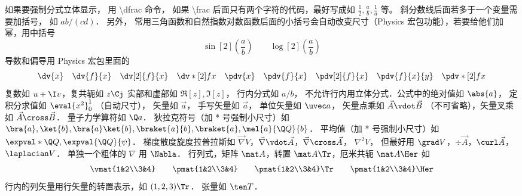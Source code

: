 如果要强制分式立体显示， 用 \textbackslash dfrac 命令， 如果 \textbackslash frac 后面只有两个字符的代码，最好写成如 $\frac12, \frac ab, \frac1a$ 等。 斜分数线后面若多于一个变量需要加括号， 如 $ab/(cd)$． 另外， 常用三角函数和自然指数对数函数后面的小括号会自动改变尺寸（Physics 宏包功能），若要给他们加幂，用中括号
\begin{equation}
\sin[2](\frac ab) \qquad \log[2](\frac ab)
\end{equation}
导数和偏导用 Physics 宏包里面的
\begin{equation}
\dv{x} \quad \dv{f}{x} \quad \dv[2]{f}{x} \quad \dv*[2]{f}{x} \quad
\pdv{x} \quad \pdv{f}{x} \quad \pdv[2]{f}{x} \quad \pdv{f}{x}{y} \quad \pdv*[2]{f}{x}
\end{equation}
复数如 $u+\I v$，复共轭如 $z\Cj$ 实部和虚部如 $\Re[z], \Im[z]$，  行内分式如 $a/b$， 不允许行内用立体分式．公式中的绝对值如 $\abs{a}$， 定积分求值如 $\eval{x^2}_0^1$ （自动尺寸）， 矢量如 $\vec a$， 手写矢量如 $\overrightarrow{a}$， 单位矢量如 $\uvec a$， 矢量点乘如 $\vec A \vdot \vec B$ （不可省略），矢量叉乘如 $\vec A\cross\vec B$． 量子力学算符如 $\Q a$． 狄拉克符号（加 * 号强制小尺寸）如 $\bra{a}, \ket{b}, \bra{a}\ket{b}, \braket{a}{b}, \braket{a}, \mel{a}{\Q Q}{b}$． 平均值（加 * 号强制小尺寸）如 $\expval*{\Q Q}, \expval{\Q Q}{\psi}$． 梯度散度旋度拉普拉斯如 $\vec\nabla V$，$\vec\nabla\vdot\vec A$，$\vec\nabla\cross\vec A$，  $\nabla^2 V$， 但最好用 $\grad V$，$\div\vec A$，$\curl\vec A$，  $\laplacian V$． 单独一个粗体的 $\nabla$ 用 $\Nabla$． 行列式，矩阵 $\mat A$，转置 $\mat A \Tr$，厄米共轭 $\mat A \Her$ 如
\begin{equation}
\vmat{1&2\\3&4} \qquad 
\pmat{1&2\\3&4} \qquad 
\pmat{1&2\\3&4}\Tr \qquad
\pmat{1&2\\3&4}\Her
\end{equation}
行内的列矢量用行矢量的转置表示，如 $(1,2,3)\Tr$． 张量如 $\ten T$．

